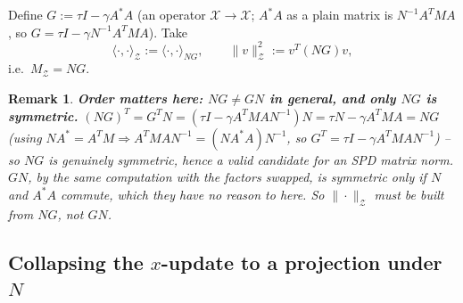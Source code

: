 \documentclass[11pt]{article}
\newtheorem{remark}{Remark}
\begin{document}
Define $G:=\tau I-\gamma A^*A$ (an operator $\mathcal X\to\mathcal X$; $A^*A$ as a plain
matrix is $N^{-1}A^TMA$, so $G=\tau I-\gamma N^{-1}A^TMA$). Take
\begin{equation}
  \label{eq:MZ}
  \langle\cdot,\cdot\rangle_\mathcal Z := \langle\cdot,\cdot\rangle_{NG}, \qquad
  \|v\|_\mathcal Z^2 := v^T(NG)v,
\end{equation}
i.e.\ $M_\mathcal Z=NG$.

\begin{remark}
\textbf{Order matters here: $NG\ne GN$ in general, and only $NG$ is symmetric.} $(NG)^T=
G^TN=(\tau I-\gamma A^TMAN^{-1})N=\tau N-\gamma A^TMA=NG$ (using $NA^*=A^TM\Rightarrow
A^TMAN^{-1}=(NA^*A)N^{-1}$, so $G^T=\tau I-\gamma A^TMAN^{-1}$) -- so $NG$ is genuinely
symmetric, hence a valid candidate for an SPD matrix norm. $GN$, by the same computation
with the factors swapped, is symmetric only if $N$ and $A^*A$ commute, which they have no
reason to here. So $\|\cdot\|_\mathcal Z$ must be built from $NG$, not $GN$.
\end{remark}

\subsection{Collapsing the $x$-update to a projection under $N$}
\label{sec:collapse}
\end{document}
